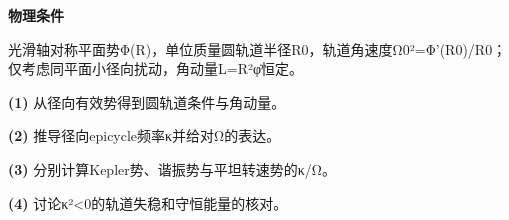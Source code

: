 \textbf{物理条件}\par 光滑轴对称平面势Φ(R)，单位质量圆轨道半径R0，轨道角速度Ω0²=Φ'(R0)/R0；仅考虑同平面小径向扰动，角动量L=R²φ̇恒定。
\par\noindent\textbf{(1)} 从径向有效势得到圆轨道条件与角动量。
\par\noindent\textbf{(2)} 推导径向epicycle频率κ并给对Ω的表达。
\par\noindent\textbf{(3)} 分别计算Kepler势、谐振势与平坦转速势的κ/Ω。
\par\noindent\textbf{(4)} 讨论κ²<0的轨道失稳和守恒能量的核对。
